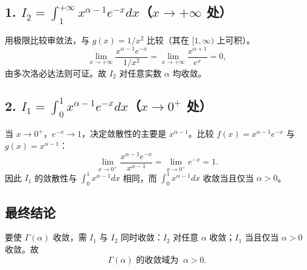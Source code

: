 \documentclass[UTF8,a4paper,12pt]{ctexart}
\numberwithin{equation}{section}
\begin{document}
\subsection*{1. $I_2 = \int_1^{+\infty} x^{\alpha-1} e^{-x} dx$（$x\to+\infty$ 处）}
用极限比较审敛法，与 \(g(x)=1/x^2\) 比较（其在 $[1,\infty)$ 上可积）。
\begin{equation}
\lim_{x\to+\infty} \frac{x^{\alpha-1} e^{-x}}{1/x^2} = \lim_{x\to+\infty} \frac{x^{\alpha+1}}{e^x} = 0,
\end{equation}
由多次洛必达法则可证。故 $I_2$ 对任意实数 $\alpha$ 均收敛。

\subsection*{2. $I_1 = \int_0^1 x^{\alpha-1} e^{-x} dx$（$x\to 0^+$ 处）}
当 $x\to 0^+$，$e^{-x}\to 1$，决定敛散性的主要是 $x^{\alpha-1}$。比较 \(f(x)=x^{\alpha-1} e^{-x}\) 与 \(g(x)=x^{\alpha-1}\)：
\begin{equation}
\lim_{x\to 0^+} \frac{x^{\alpha-1} e^{-x}}{x^{\alpha-1}} = \lim_{x\to 0^+} e^{-x} = 1.
\end{equation}
因此 $I_1$ 的敛散性与 $\int_0^1 x^{\alpha-1} dx$ 相同，而 \(\int_0^1 x^{\alpha-1} dx\) 收敛当且仅当 $\alpha>0$。

\subsection*{最终结论}
要使 $\Gamma(\alpha)$ 收敛，需 $I_1$ 与 $I_2$ 同时收敛：$I_2$ 对任意 $\alpha$ 收敛；$I_1$ 当且仅当 $\alpha>0$ 收敛。故
\begin{equation}
\boxed{\text{$\Gamma(\alpha)$ 的收敛域为 }\ \alpha>0.}
\end{equation}
\end{document}
